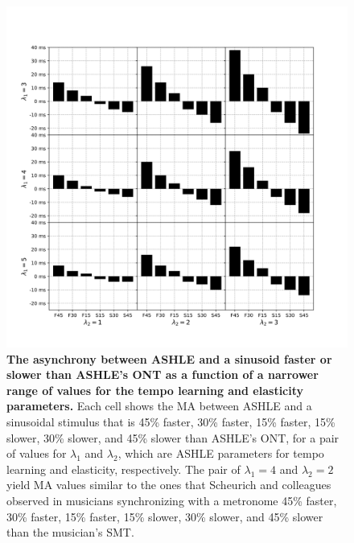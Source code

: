 \documentclass{report}
\begin{document}
\begin{figure}
    \centering
    \includegraphics[width=1.0\textwidth]{figures/fig3_7.png}
    \caption[The asynchrony between ASHLE and a sinusoid faster or slower than ASHLE's ONT as a function of a narrower range of values for the tempo learning and elasticity parameters]{\textbf{The asynchrony between ASHLE and a sinusoid faster or slower than ASHLE's ONT as a function of a narrower range of values for the tempo learning and elasticity parameters.} Each cell shows the MA between ASHLE and a sinusoidal stimulus that is 45\% faster, 30\% faster, 15\% faster, 15\% slower, 30\% slower, and 45\% slower than ASHLE's ONT, for a pair of values for $\lambda_1$ and $\lambda_2$, which are ASHLE parameters for tempo learning and elasticity, respectively. The pair of $\lambda_1=4$ and $\lambda_2=2$ yield MA values similar to the ones that Scheurich and colleagues \cite{scheurich2018tapping} observed in musicians synchronizing with a metronome 45\% faster, 30\% faster, 15\% faster, 15\% slower, 30\% slower, and 45\% slower than the musician's SMT.}
    \label{f3_7}
\end{figure}
\end{document}
